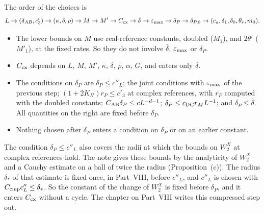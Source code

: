 \begin{detail}
\begin{step}
The order of the choices is
\[
L\to(\delta_{AB},c'_3)\to(\kappa,\delta,\rho)\to M\to M'\to C_{\rm cx}\to\bar\delta\to\varepsilon_{\max}\to\delta_P\to\delta_{P,0}\to(c_a,\delta_1,\delta_0,\theta_r,m_0).
\]
\begin{itemize}
\item The lower bounds on $M$ use real-reference constants, doubled ($M_1$), and $2\theta'$ ($M'_1$), at the fixed rates. So they do not involve $\bar\delta$, $\varepsilon_{\max}$ or $\delta_P$.
\item $C_{\rm cx}$ depends on $L$, $M$, $M'$, $\kappa$, $\delta$, $\rho$, $\alpha$, $G$, and enters only $\bar\delta$.
\item The conditions on $\delta_P$ are $\delta_P\le c''_L$; the joint conditions with $\varepsilon_{\max}$ of the previous step; $(1+2K_H)r_P\le c'_3$ at complex references, with $r_P$ computed with the doubled constants; $C_{\rm AB}\delta_P\le cL^{-d-1}$; $\delta_P\le c_{\rm DC}r_ML^{-1}$; and $\delta_P\le\bar\delta$. All quantities on the right are fixed before $\delta_P$.
\item Nothing chosen after $\delta_P$ enters a condition on $\delta_P$ or on an earlier constant.
\end{itemize}
The condition $\delta_P\le c''_L$ also covers the radii at which the bounds on $W_2^X$ at complex references hold. The note gives these bounds by the analyticity of $W_2^X$ and a Cauchy estimate on a ball of twice the radius (Proposition~(c)). The radius $\delta_*$ of that estimate is fixed once, in Part~VIII, before $c''_L$, and $c''_L$ is chosen with $C_{\rm cmp}c''_L\le\delta_*$. So the constant of the change of $W_2^X$ is fixed before $\delta_P$, and it enters $C_{\rm cx}$ without a cycle. The chapter on Part~VIII writes this compressed step out.
\end{step}
\end{detail}

